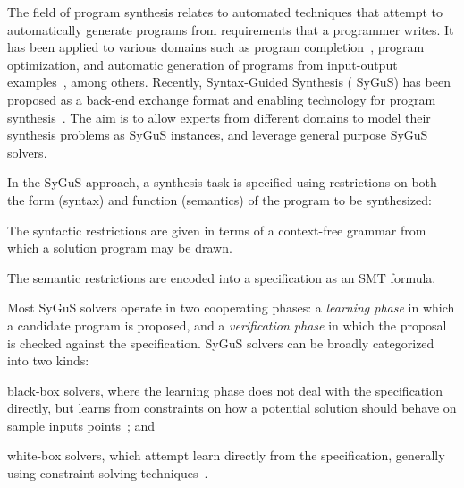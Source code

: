 \documentclass{llncs}
\newcommand{\sygus}{{\sffamily\fontsize{8.5}{10}\selectfont
    SyGuS}\xspace}
\begin{document}
The field of program synthesis relates to automated techniques that
attempt to automatically generate programs from requirements that a
programmer writes.
It has been applied to various domains such as program
completion~\cite{solar-lezama-05}, program optimization, and automatic
generation of programs from input-output
examples~\cite{gulwani-popl-11}, among others.
Recently, Syntax-Guided Synthesis (\sygus) has been proposed as a
back-end exchange format and enabling technology for program
synthesis~\cite{udupa-sygus}.
The aim is to allow experts from different domains to model their
synthesis problems as \sygus instances, and leverage general purpose
\sygus solvers.

In the \sygus approach, a synthesis task is specified using
restrictions on both the form (syntax) and function (semantics) of the
program to be synthesized:
\begin{inparaenum}[(a)]
\item The syntactic restrictions are given in terms of a context-free
  grammar from which a solution program may be drawn.
\item The semantic restrictions are encoded into a specification as an
  SMT formula.
\end{inparaenum}
Most \sygus solvers operate in two cooperating phases: a {\em learning
  phase} in which a candidate program is proposed, and a {\em
verification phase} in which the proposal is checked against the
specification.
\sygus solvers can be broadly categorized into two kinds:
\begin{inparaenum}[(a)]
\item black-box solvers, where the learning phase does not deal with the
  specification directly, but learns from constraints on how a potential
  solution should behave on sample inputs
  points~\cite{udupa-transit,udupa-sygus,saha-15}; and
\item white-box solvers, which attempt learn directly from the
  specification, generally using constraint solving techniques~\cite{reynolds-15,alur-15}.
\end{inparaenum}
\end{document}
